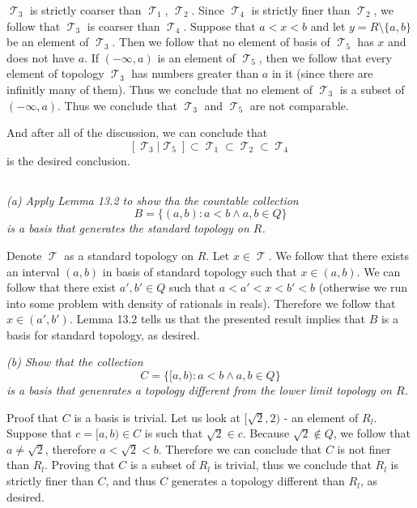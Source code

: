 \documentclass[11pt,oneside,titlepage]{book}
\DeclareMathOperator \topol {\mathcal {T}}
\newcommand{\set}[1]{\{ #1 \}}
\begin{document}
$\topol_3$ is strictly coarser than $\topol_1$, $\topol_2$. Since $\topol_4$
is strictly finer than $\topol_2$, we follow that $\topol_3$ is coarser than $\topol_4$.
Suppose that $a < x < b$ and let $y = R \setminus \set{a, b}$ be an element of $\topol_3$.
Then we follow that no element of basis of $\topol_5$ has $x$ and does not have $a$.
If $(-\infty, a)$ is an element of $\topol_5$, then we follow that every element of topology
$\topol_3$ has numbers greater than $a$ in it (since there are infinitly  many of them).
Thus we conclude that no element of $\topol_3$ is a subset of $(-\infty, a)$. Thus we
conclude that $\topol_3$ and $\topol_5$ are not comparable.

And after all of the discussion, we can conclude that
$$[\topol_3 | \topol_5] \subset \topol_1 \subset \topol_2 \subset \topol_4$$
is the desired conclusion.

\subsection{}

\textit{(a) Apply Lemma 13.2 to show tha the countable collection
  $$B = \set{(a, b): a < b \land a, b \in Q}$$
  is a basis that generates the standard topology on $R$.}

Denote $\topol$ as a standard topology on $R$. Let $x \in \topol$. We follow that
there exists an interval $(a, b)$ in basis of standard topology such that
$x \in (a, b)$. We can follow that there exist $a', b' \in Q$ such that
$a < a' < x < b' < b$ (otherwise we run into some problem with density of rationals
in reals). Therefore we follow that $x \in (a', b')$. Lemma 13.2 tells us that
the presented result implies that $B$ is a basis for standard topology, as desired.

\textit{(b) Show that the collection
  $$C = \set{[a, b): a < b \land a, b \in Q}$$
  is a basis that genenrates a topology different from the lower limit topology on $R$.}

Proof that $C$ is a basis is trivial.
Let us look at $[\sqrt{2}, 2)$ - an element of $R_l$. Suppose that $c = [a, b) \in C$ is
such that $\sqrt{2} \in c$. Because $\sqrt{2} \notin Q$, we follow that
$a \neq \sqrt{2}$, therefore $a < \sqrt{2} < b$. Therefore we can conclude that $C$ is
not finer than $R_l$. Proving that $C$ is a subset of $R_l$ is trivial, thus
we conclude that $R_l$ is strictly finer than $C$, and thus $C$ generates a topology
different than $R_l$, as desired.
\end{document}
